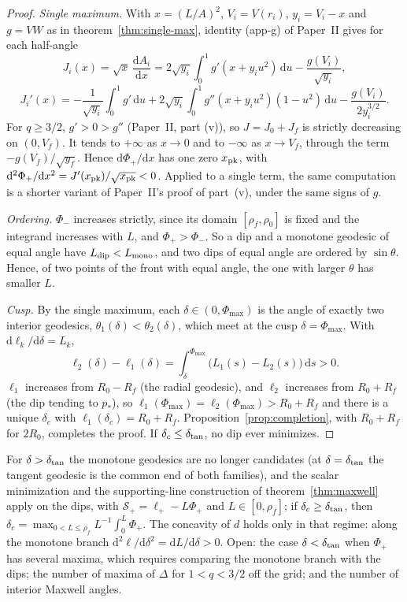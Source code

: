 \documentclass[aip,jmp,amsmath,amssymb,reprint]{revtex4-2}
\newcommand{\dd}{\mathrm{d}}
\theoremstyle{plain}
\theoremstyle{definition}
\begin{document}
\begin{proof}
\emph{Single maximum.} With $x=(L/A)^2$, $V_i=V(r_i)$, $y_i=V_i-x$ and $g=VW$ as in
theorem~\ref{thm:single-max}, identity (app-g) of Paper~II gives for each half-angle
\[
  J_i(x)=\sqrt x\,\frac{\dd A_i}{\dd x}
  =2\sqrt{y_i}\int_0^1g'(x+y_iu^2)\,\dd u-\frac{g(V_i)}{\sqrt{y_i}},
\]
\[
  J_i'(x)=-\frac1{\sqrt{y_i}}\int_0^1g'\,\dd u
  +2\sqrt{y_i}\int_0^1g''(x+y_iu^2)(1-u^2)\,\dd u-\frac{g(V_i)}{2y_i^{3/2}} .
\]
For $q\ge3/2$, $g'>0>g''$ (Paper~II, part (v)), so $J=J_0+J_f$ is strictly decreasing on
$(0,V_f)$. It tends to $+\infty$ as $x\to0$ and to $-\infty$ as $x\to V_f$, through the term
$-g(V_f)/\sqrt{y_f}$. Hence $\dd\Phi_+/\dd x$ has one zero $x_{\rm pk}$, with
$\dd^2\Phi_+/\dd x^2=J'(x_{\rm pk})/\sqrt{x_{\rm pk}}<0$. Applied to a single term, the same
computation is a shorter variant of Paper~II's proof of part~(v), under the same signs of $g$.

\emph{Ordering.} $\Phi_-$ increases strictly, since its domain $[\rho_f,\rho_0]$ is fixed and
the integrand increases with $L$, and $\Phi_+>\Phi_-$. So a dip and a monotone geodesic of
equal angle have $L_{\rm dip}<L_{\rm mono}$, and two dips of equal angle are ordered by
$\sin\theta$. Hence, of two points of the front with equal angle, the one with larger $\theta$
has smaller $L$.

\emph{Cusp.} By the single maximum, each $\delta\in(0,\Phi_{\max})$ is the angle of exactly two
interior geodesics, $\theta_1(\delta)<\theta_2(\delta)$, which meet at the cusp
$\delta=\Phi_{\max}$. With $\dd\ell_k/\dd\delta=L_k$,
\[
  \ell_2(\delta)-\ell_1(\delta)=\int_\delta^{\Phi_{\max}}\bigl(L_1(s)-L_2(s)\bigr)\,\dd s>0 .
\]
$\ell_1$ increases from $R_0-R_f$ (the radial geodesic), and $\ell_2$ increases from $R_0+R_f$
(the dip tending to $p_*$), so $\ell_1(\Phi_{\max})=\ell_2(\Phi_{\max})>R_0+R_f$ and there is a
unique $\delta_c$ with $\ell_1(\delta_c)=R_0+R_f$. Proposition~\ref{prop:completion}, with
$R_0+R_f$ for $2R_0$, completes the proof. If $\delta_c\le\delta_{\rm tan}$, no dip ever
minimizes.
\end{proof}

For $\delta>\delta_{\rm tan}$ the monotone geodesics are no longer candidates (at $\delta=\delta_{\rm tan}$ the
tangent geodesic is the common end of both families), and the scalar minimization
and the supporting-line construction of theorem~\ref{thm:maxwell} apply on the dips, with $\mathcal S_+=\ell_+-L\Phi_+$ and $L\in[0,\rho_f]$;
if $\delta_c\ge\delta_{\rm tan}$, then $\delta_c=\max_{0<L\le\rho_f}L^{-1}\int_0^L\Phi_+$. The
concavity of $d$ holds only in that regime: along the monotone branch
$\dd^2\ell/\dd\delta^2=\dd L/\dd\delta>0$. Open: the case $\delta<\delta_{\rm tan}$ when $\Phi_+$ has
several maxima, which requires comparing the monotone branch with the dips; the number of
maxima of $\Delta$ for $1<q<3/2$ off the grid; and the number of interior Maxwell angles.
\end{document}
